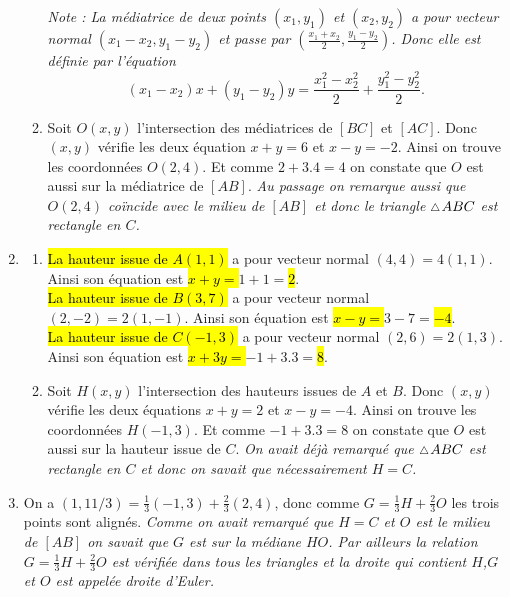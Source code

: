 \documentclass[a4paper,12pt,reqno]{amsart}
\begin{document}
\begin{solution}
\begin{enumerate}
\begin{enumerate}
        \emph{
          Note : La médiatrice de deux points $(x_{1},y_{1})$ et $(x_{2},y_{2})$ a pour vecteur normal $(x_{1}-x_{2},y_{1}-y_{2})$ et passe par $(\frac{x_{1}+x_{2}}{2},\frac{y_{1}-y_{2}}{2})$. Donc elle est définie par l'équation
          \[
            (x_{1}-x_{2})x+(y_{1}-y_{2})y=\frac{x_{1}^{2}-x_{2}^{2}}{2}+\frac{y_{1}^{2}-y_{2}^{2}}{2}.
          \]
        }
        \item Soit $O(x,y)$ l'intersection des médiatrices de $[BC]$ et $[AC]$. Donc $(x,y)$ vérifie les deux équation $x+y=6$ et $x-y=-2$. Ainsi on trouve les coordonnées $O(2,4)$. Et comme $2+3.4=4$ on constate que $O$ est aussi sur la médiatrice de $[AB]$. \emph{Au passage on remarque aussi que $O(2,4)$ coïncide avec le milieu de $[AB]$ et donc le triangle $\tri ABC$ est rectangle en $C$.}
      \end{enumerate}
    \item
      \begin{enumerate}
        \item
        \hl{La hauteur issue de $A(1,1)$ }a pour vecteur normal $(4,4)=4(1,1)$. Ainsi son équation est \hl{$x+y=$}$1+1=$\hl{$2$}.\\
        \hl{La hauteur issue de $B(3,7)$ }a pour vecteur normal $(2,-2)=2(1,-1)$. Ainsi son équation est \hl{$x-y=$}$3-7=$\hl{$-4$}.\\
        \hl{La hauteur issue de $C(-1,3)$} a pour vecteur normal $(2,6)=2(1,3)$. Ainsi son équation est \hl{$x+3y=$}$-1+3.3=$\hl{$8$}.
        \item Soit $H(x,y)$ l'intersection des hauteurs issues de $A$ et $B$. Donc $(x,y)$ vérifie les deux équations $x+y=2$ et $x-y=-4$. Ainsi on trouve les coordonnées $H(-1,3)$. Et comme $-1+3.3=8$ on constate que $O$ est aussi sur la hauteur issue de $C$. \emph{On avait déjà remarqué que $\tri ABC$ est rectangle en $C$ et donc on savait que nécessairement $H=C$.}
      \end{enumerate}
    \item On a $(1,11/3) = \frac{1}{3}(-1,3) + \frac{2}{3}(2,4)$, donc comme $G=\frac{1}{3}H + \frac{2}{3}O$ les trois points sont alignés. \emph{Comme on avait remarqué que $H=C$ et $O$ est le milieu de $[AB]$ on savait que $G$ est sur la médiane $HO$. Par ailleurs la relation $G=\frac{1}{3}H + \frac{2}{3}O$ est vérifiée dans tous les triangles et la droite qui contient $H$,$G$ et $O$ est appelée \emph{droite d'Euler}.}
  \end{enumerate}

\end{solution}
\end{document}

